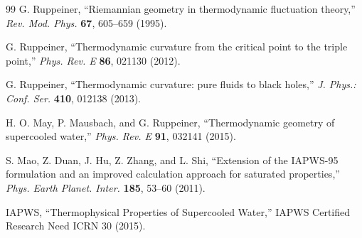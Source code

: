 \documentclass[12pt]{article}
\begin{document}
\begin{thebibliography}{99}
G. Ruppeiner, ``Riemannian geometry in thermodynamic fluctuation theory,'' \textit{Rev. Mod. Phys.} \textbf{67}, 605--659 (1995).

G. Ruppeiner, ``Thermodynamic curvature from the critical point to the triple point,'' \textit{Phys. Rev. E} \textbf{86}, 021130 (2012).

G. Ruppeiner, ``Thermodynamic curvature: pure fluids to black holes,'' \textit{J. Phys.: Conf. Ser.} \textbf{410}, 012138 (2013).

H. O. May, P. Mausbach, and G. Ruppeiner, ``Thermodynamic geometry of supercooled water,'' \textit{Phys. Rev. E} \textbf{91}, 032141 (2015).

S. Mao, Z. Duan, J. Hu, Z. Zhang, and L. Shi, ``Extension of the IAPWS-95 formulation and an improved calculation approach for saturated properties,'' \textit{Phys. Earth Planet. Inter.} \textbf{185}, 53--60 (2011).

IAPWS, ``Thermophysical Properties of Supercooled Water,'' IAPWS Certified Research Need ICRN 30 (2015).

\end{thebibliography}
\end{document}
